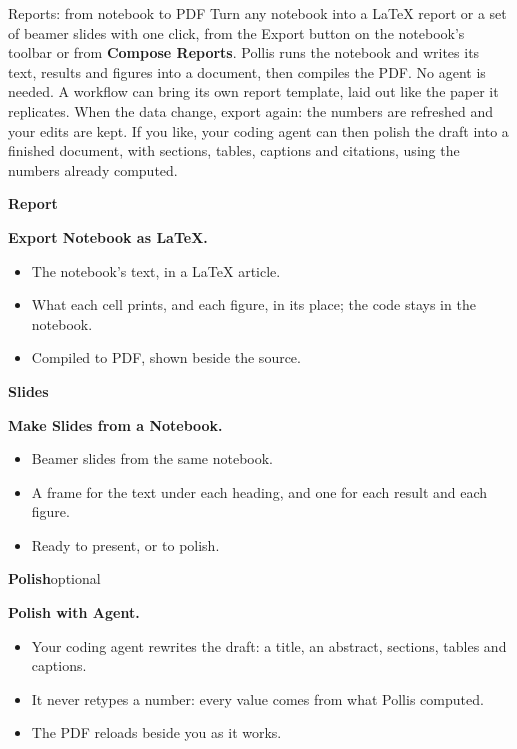 \documentclass[10pt,a4paper]{article}
\newcommand{\collabmode}[4]{%
  \begin{tcolorbox}[enhanced, colback=white, colframe=navy, boxrule=0.6pt, arc=3pt,
     left=7pt,right=7pt,top=7pt,bottom=7pt, fontupper=\small\raggedright]
   {\color{navy}\large\bfseries #1}\hfill{\footnotesize\color{soft}#2}\par\vspace{2pt}
   {\color{deepamber}\bfseries #3}\par\vspace{4pt}
   #4
  \end{tcolorbox}}
\begin{document}
\begin{pbox}{Reports: from notebook to PDF}
Turn any notebook into a LaTeX report or a set of beamer slides with one click, from the Export button
on the notebook's toolbar or from \textbf{Compose \textrightarrow{} Reports}. Pollis runs the notebook and
writes its text, results and figures into a document, then compiles the PDF. No agent is needed. A
workflow can bring its own report template, laid out like the paper it replicates. When the data change,
export again: the numbers are refreshed and your edits are kept. If you like, your coding agent can then
polish the draft into a finished document, with sections, tables, captions and citations, using the
numbers already computed.
\end{pbox}

\vspace{4mm}
\begin{tcbraster}[raster columns=3, raster equal height, raster column skip=3mm]
\collabmode{Report}{}{Export Notebook as LaTeX.}{%
  \begin{itemize}[leftmargin=1em]
  \item The notebook's text, in a LaTeX article.
  \item What each cell prints, and each figure, in its place; the code stays in the notebook.
  \item Compiled to PDF, shown beside the source.
  \end{itemize}}
\collabmode{Slides}{}{Make Slides from a Notebook.}{%
  \begin{itemize}[leftmargin=1em]
  \item Beamer slides from the same notebook.
  \item A frame for the text under each heading, and one for each result and each figure.
  \item Ready to present, or to polish.
  \end{itemize}}
\collabmode{Polish}{optional}{Polish with Agent.}{%
  \begin{itemize}[leftmargin=1em]
  \item Your coding agent rewrites the draft: a title, an abstract, sections, tables and captions.
  \item It never retypes a number: every value comes from what Pollis computed.
  \item The PDF reloads beside you as it works.
  \end{itemize}}
\end{tcbraster}
\end{document}
